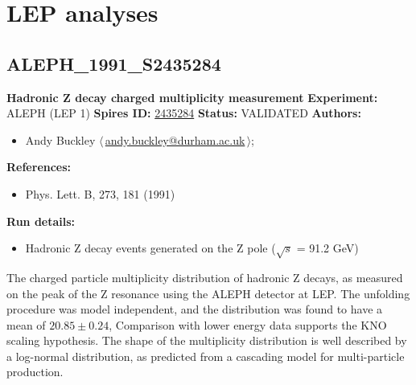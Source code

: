 \makeatletter
\renewcommand{\d}[1]{\ensuremath{\mathrm{#1}}}
\let\old@eta\eta
\renewcommand{\eta}{\ensuremath{\old@eta}\xspace}
\let\old@phi\phi
\renewcommand{\phi}{\ensuremath{\old@phi}\xspace}
\providecommand{\pT}{\ensuremath{p_\perp}\xspace}
\providecommand{\pTmin}{\ensuremath{p_\perp^\text{min}}\xspace}
\makeatother

\section{LEP analyses}
\subsection[ALEPH\_1991\_S2435284]{ALEPH\_1991\_S2435284\,\cite{Decamp:1991uz}}
\textbf{Hadronic Z decay charged multiplicity measurement}\newline
\textbf{Experiment:} ALEPH (LEP 1) \newline
\textbf{Spires ID:} \href{http://www.slac.stanford.edu/spires/find/hep/www?rawcmd=key+2435284}{2435284}\newline
\textbf{Status:} VALIDATED\newline
\textbf{Authors:}
\begin{itemize}
  \item Andy Buckley $\langle\,$\href{mailto:andy.buckley@durham.ac.uk}{andy.buckley@durham.ac.uk}$\,\rangle$;
\end{itemize}
\textbf{References:}
\begin{itemize}
  \item Phys. Lett. B, 273, 181 (1991)
\end{itemize}
\textbf{Run details:}
\begin{itemize}

  \item Hadronic Z decay events generated on the Z pole (\ensuremath{\sqrt{s}} = 91.2 GeV)\end{itemize}

\noindent The charged particle multiplicity distribution of hadronic Z decays, as measured on the peak of the Z resonance using the ALEPH detector at LEP. The unfolding procedure was model independent, and the distribution was found to have a mean of $20.85 \pm 0.24$, Comparison with lower energy data supports the KNO scaling hypothesis. The shape of the multiplicity distribution is well described by a log-normal distribution, as predicted from a cascading model for multi-particle production.


